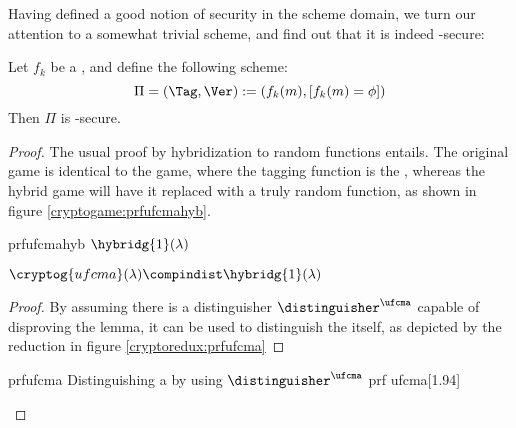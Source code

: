 Having defined a good notion of security in the \mac{} scheme domain, we turn our attention to a somewhat trivial scheme, and find out that it is indeed \ufcma-secure:

\begin{theorem}
    Let $f_k$ be a \prf, and define the following \mac{} scheme: 
    \[
        \Pi = (\Tag, \Ver) := (f_k(m), [f_k(m) = \phi])
    \]
    Then $\Pi$ is \ufcma-secure.
\end{theorem}

\begin{proof}
    The usual proof by hybridization to random functions entails. The original game is identical to the \ufcma{} game, where the tagging function is the \prf, whereas the hybrid game will have it replaced with a truly random function, as shown in figure \ref{cryptogame:prfufcmahyb}.

    \begin{cryptogame}
        {prfufcmahyb}
        {$\hybridg{1}(\lambda)$}
        {}


        \cseqbeginloop
        \cseqendloop

        \cseqdelay


    \end{cryptogame}

    \begin{lemma}
        $\cryptog{ufcma}(\lambda) \compindist \hybridg{1}(\lambda)$  
    \end{lemma}

    \begin{proof}
        By assuming there is a distinguisher $\distinguisher^{\ufcma}$ capable of disproving the lemma, it can be used to distinguish the \prf{} itself, as depicted by the reduction in figure \ref{cryptoredux:prfufcma}
    \end{proof}

    \begin{cryptoredux}
        {prfufcma}
        {Distinguishing a \prf{} by using $\distinguisher^{\ufcma}$}
        {prf}
        {ufcma}[1.94]

    

\end{cryptoredux}
\end{proof}
